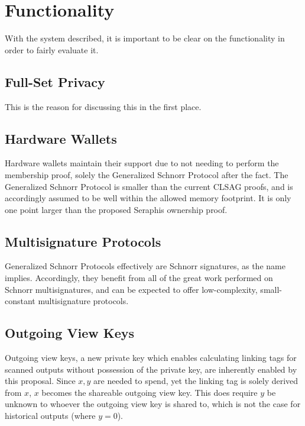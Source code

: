 \documentclass[]{article}
\begin{document}
\newpage

\section{Functionality}

With the system described, it is important to be clear on the functionality in order to fairly evaluate it.

\subsection{Full-Set Privacy}

This is the reason for discussing this in the first place.

\subsection{Hardware Wallets}

Hardware wallets maintain their support due to not needing to perform the membership proof, solely the Generalized Schnorr Protocol after the fact. The Generalized Schnorr Protocol is smaller than the current CLSAG proofs, and is accordingly assumed to be well within the allowed memory footprint. It is only one point larger than the proposed Seraphis ownership proof.

\subsection{Multisignature Protocols}

Generalized Schnorr Protocols effectively are Schnorr signatures, as the name implies. Accordingly, they benefit from all of the great work performed on Schnorr multisignatures, and can be expected to offer low-complexity, small-constant multisignature protocols.

\subsection{Outgoing View Keys}

Outgoing view keys, a new private key which enables calculating linking tags for scanned outputs without possession of the private key, are inherently enabled by this proposal. Since $x, y$ are needed to spend, yet the linking tag is solely derived from $x$, $x$ becomes the shareable outgoing view key. This does require $y$ be unknown to whoever the outgoing view key is shared to, which is not the case for historical outputs (where $y = 0$).
\end{document}
